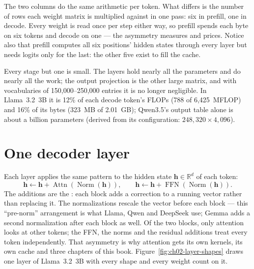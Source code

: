 \noindent The two columns do the same arithmetic per token. What differs is
the number of rows each weight matrix is multiplied against in one pass: six
in prefill, one in decode. Every weight is read once per step either way, so
prefill spends each byte on six tokens and decode on one --- the asymmetry
 measures and  prices. Notice also that
prefill computes all six positions' hidden states through every layer but
needs logits only for the last: the other five exist to fill the cache.

Every stage but one is small. The layers hold nearly all the parameters and
do nearly all the work; the output projection is the other large matrix, and
with vocabularies of 150,000--250,000 entries it is no longer negligible. In
Llama~3.2~3B it is 12\% of each decode token's FLOPs (788 of 6,425~MFLOP) and
16\% of its bytes (323~MB of 2.01~GB); Qwen3.5's output table alone is about a
billion parameters (derived from its configuration:
$248{,}320\times4{,}096$).

\section{One decoder layer}

Each layer applies the same pattern to the hidden state
$\mathbf{h}\in\mathbb{R}^{d}$ of each token:
\begin{equation}
\mathbf{h} \leftarrow \mathbf{h} + \operatorname{Attn}(\operatorname{Norm}(\mathbf{h})),
\qquad
\mathbf{h} \leftarrow \mathbf{h} + \operatorname{FFN}(\operatorname{Norm}(\mathbf{h})).
\label{eq:layer}
\end{equation}
The additions are the : each block adds a correction to
a running vector rather than replacing it. The normalizations rescale the
vector before each block --- this ``pre-norm'' arrangement is what Llama, Qwen
and DeepSeek use; Gemma adds a second normalization after each block as well.
Of the two blocks, only attention looks at other tokens; the FFN, the norms and
the residual additions treat every token independently. That asymmetry is why
attention gets its own kernels, its own cache and three chapters of this book.
Figure~\ref{fig:ch02-layer-shapes} draws one layer of Llama~3.2~3B with every
shape and every weight count on it.


